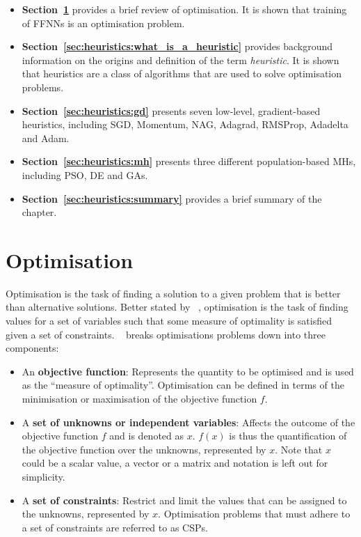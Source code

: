 \begin{itemize}
      \item \textbf{Section~\ref{sec:heuristics:optimisation}} provides a brief review of optimisation. It is shown that training of \acp{FFNN} is an optimisation problem.

      \item \textbf{Section~\ref{sec:heuristics:what_is_a_heuristic}} provides background information on the origins and definition of the term \textit{heuristic}. It is shown that heuristics are a class of algorithms that are used to solve optimisation problems.

      \item \textbf{Section~\ref{sec:heuristics:gd}} presents seven low-level, gradient-based heuristics, including \acf{SGD}, \acf{Momentum}, \acf{NAG}, \acf{Adagrad}, \acf{RMSProp}, \acf{Adadelta} and \acf{Adam}.

      \item \textbf{Section~\ref{sec:heuristics:mh}} presents three different population-based \acp{MH}, including \acf{PSO}, \acf{DE} and \acfp{GA}.

      \item \textbf{Section~\ref{sec:heuristics:summary}} provides a brief summary of the chapter.
\end{itemize}

\section{Optimisation}\label{sec:heuristics:optimisation}

Optimisation is the task of finding a solution to a given problem that is better than alternative solutions. Better stated by \citeauthor{ref:oldewage:2017}~\cite{ref:oldewage:2017}, optimisation is the task of finding values for a set of variables such that some measure of optimality is satisfied given a set of constraints. \citeauthor{ref:engelbrecht:2007}~\cite{ref:engelbrecht:2007} breaks optimisations problems down into three components:

\begin{itemize}
      \item An \textbf{objective function}: Represents the quantity to be optimised and is used as the ``measure of optimality''. Optimisation can be defined in terms of the minimisation or maximisation of the objective function $f$.

      \item A \textbf{set of unknowns or independent variables}: Affects the outcome of the objective function $f$ and is denoted as $x$. $f(x)$ is thus the quantification of the objective function over the unknowns, represented by $x$. Note that $x$ could be a scalar value, a vector or a matrix and notation is left out for simplicity.

      \item A \textbf{set of constraints}: Restrict and limit the values that can be assigned to the unknowns, represented by $x$. Optimisation problems that must adhere to a set of constraints are referred to as \acfp{CSP}.
\end{itemize}

